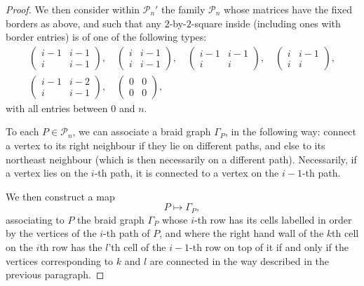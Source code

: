 \documentclass[11pt, reqno]{amsart}
\theoremstyle{definition}
\numberwithin{equation}{section}
\newcommand{\msP}{\mathscr{P}}
\begin{document}
\begin{proof}
We then consider within $\msP_n'$ the family $\msP_n$ whose matrices have the fixed borders as above, and such that any $2$-by-$2$-square inside (including ones with border entries) is of one of the following types: 
\begin{multline}\label{EqMatrixGraph}
\begin{pmatrix} i-1 & i-1 \\ i & i-1\end{pmatrix},\quad \begin{pmatrix} i & i-1\\ i & i-1\end{pmatrix},\quad \begin{pmatrix} i- 1 & i-1 \\ i & i \end{pmatrix},\quad \begin{pmatrix}i & i-1 \\i & i \end{pmatrix},\\ \begin{pmatrix} i-1 & i-2 \\ i & i-1\end{pmatrix},\quad \begin{pmatrix} 0 & 0 \\ 0 & 0\end{pmatrix},
\end{multline}
with all entries  between $0$ and $n$. 

To each $P \in \msP_n$, we can associate a braid graph $\Gamma_P$, in the following way: connect a vertex to its right neighbour if they lie on different paths, and else to its northeast neighbour (which is then necessarily on a different path). Necessarily, if a vertex lies on the $i$-th path, it is connected to a vertex on the $i-1$-th path. 

We then construct a map 
\begin{equation}\label{EqCorrPaths}
P \mapsto \Gamma_P, 
\end{equation}
associating to $P$ the braid graph $\Gamma_P$ whose $i$-th row has its cells labelled in order by the vertices of the $i$-th path of $P$, and where the right hand wall of the $k$th cell on the $i$th row has the $l$'th cell of the $i-1$-th row on top of it if and only if the vertices corresponding to $k$ and $l$ are connected in the way described in the previous paragraph.


\end{proof}
\end{document}
